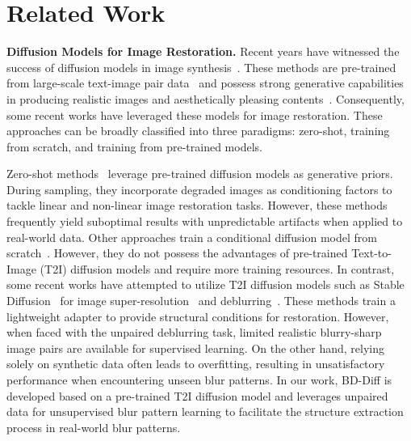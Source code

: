 \section{Related Work}
\label{Related Works}


{\bf Diffusion Models for Image Restoration.}
Recent years have witnessed the success of diffusion models in image synthesis~\cite{sohl2015deep,song2019generative,Song_Meng_Ermon_2020,ho2020denoising,rombach2022high,ye2023ip,cheng2024autostudio}. These methods are pre-trained from large-scale text-image pair data~\cite{schuhmann2022laion,krylov2021open} and possess strong generative capabilities in producing realistic images and aesthetically pleasing contents~\cite{dhariwal2021diffusion,ho2022classifier}. Consequently, some recent works have leveraged these models for image restoration. These approaches can be broadly classified into three paradigms: zero-shot, training from scratch, and training from pre-trained models. 


Zero-shot methods~\cite{pan2021exploiting,chung2022improving,wang2022zero,chung2022diffusion,kawar2022denoising} leverage pre-trained diffusion models as generative priors. During sampling, they incorporate degraded images as conditioning factors to tackle linear and non-linear image restoration tasks. However, these methods frequently yield suboptimal results with unpredictable artifacts when applied to real-world data. Other approaches train a conditional diffusion model from scratch~\cite{li2022srdiff, ozdenizci2023restoring, ren2023multiscale}. However, they do not possess the advantages of pre-trained Text-to-Image (T2I) diffusion models and require more training resources. In contrast, some recent works have attempted to utilize T2I diffusion models such as Stable Diffusion~\cite{rombach2022high} for image super-resolution~\cite{wang2024exploiting,lin2025diffbir} and deblurring~\cite{luo2023controlling,zhang2024diff,liu2024diff}. These methods train a lightweight adapter to provide structural conditions for restoration. However, when faced with the unpaired deblurring task, limited realistic blurry-sharp image pairs are available for supervised learning. On the other hand, relying solely on synthetic data often leads to overfitting, resulting in unsatisfactory performance when encountering unseen blur patterns. In our work, BD-Diff is developed based on a pre-trained T2I diffusion model and leverages unpaired data for unsupervised blur pattern learning to facilitate the structure extraction process in real-world blur patterns.


